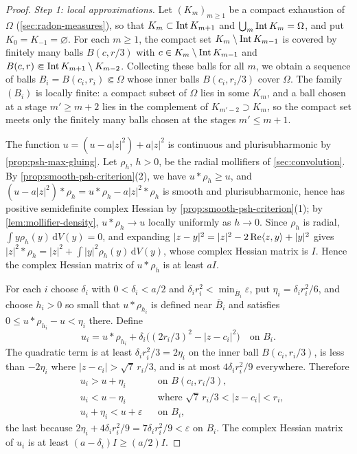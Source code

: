 \begin{proof}
\emph{Step 1: local approximations.} Let $(K_m)_{m\ge1}$ be a compact exhaustion of $\Omega$ (\cref{sec:radon-measures}), so that $K_m\subset\operatorname{Int} K_{m+1}$ and $\bigcup_m\operatorname{Int} K_m=\Omega$, and put $K_0=K_{-1}=\varnothing$. For each $m\ge1$, the compact set $K_m\setminus\operatorname{Int} K_{m-1}$ is covered by finitely many balls $B(c,r/3)$ with $c\in K_m\setminus\operatorname{Int} K_{m-1}$ and $B(c,r)\Subset\operatorname{Int} K_{m+1}\setminus K_{m-2}$. Collecting these balls for all $m$, we obtain a sequence of balls $B_i=B(c_i,r_i)\Subset\Omega$ whose inner balls $B(c_i,r_i/3)$ cover $\Omega$. The family $(B_i)$ is locally finite: a compact subset of $\Omega$ lies in some $K_m$, and a ball chosen at a stage $m'\ge m+2$ lies in the complement of $K_{m'-2}\supset K_m$, so the compact set meets only the finitely many balls chosen at the stages $m'\le m+1$.

The function $u=(u-a|z|^2)+a|z|^2$ is continuous and plurisubharmonic by \cref{prop:psh-max-gluing}. Let $\rho_h$, $h>0$, be the radial mollifiers of \cref{sec:convolution}. By \cref{prop:smooth-psh-criterion}(2), we have $u*\rho_h\ge u$, and $(u-a|z|^2)*\rho_h=u*\rho_h-a|z|^2*\rho_h$ is smooth and plurisubharmonic, hence has positive semidefinite complex Hessian by \cref{prop:smooth-psh-criterion}(1); by \cref{lem:mollifier-density}, $u*\rho_h\to u$ locally uniformly as $h\to0$. Since $\rho_h$ is radial, $\int y\rho_h(y)\,\mathrm dV(y)=0$, and expanding $|z-y|^2=|z|^2-2\operatorname{Re}\langle z,y\rangle+|y|^2$ gives $|z|^2*\rho_h=|z|^2+\int|y|^2\rho_h(y)\,\mathrm dV(y)$, whose complex Hessian matrix is $I$. Hence the complex Hessian matrix of $u*\rho_h$ is at least $aI$.

For each $i$ choose $\delta_i$ with $0<\delta_i<a/2$ and $\delta_ir_i^2<\min_{\overline B_i}\varepsilon$, put $\eta_i=\delta_ir_i^2/6$, and choose $h_i>0$ so small that $u*\rho_{h_i}$ is defined near $\overline B_i$ and satisfies $0\le u*\rho_{h_i}-u<\eta_i$ there. Define
\[
 u_i=u*\rho_{h_i}+\delta_i\bigl((2r_i/3)^2-|z-c_i|^2\bigr)
 \quad\text{on }B_i.
\]
The quadratic term is at least $\delta_ir_i^2/3=2\eta_i$ on the inner ball $B(c_i,r_i/3)$, is less than $-2\eta_i$ where $|z-c_i|>\sqrt7\,r_i/3$, and is at most $4\delta_ir_i^2/9$ everywhere. Therefore
\[
 \begin{aligned}
 &u_i>u+\eta_i&&\text{on }B(c_i,r_i/3),\\
 &u_i<u-\eta_i&&\text{where }\sqrt7\,r_i/3<|z-c_i|<r_i,\\
 &u_i+\eta_i<u+\varepsilon&&\text{on }B_i,
 \end{aligned}
\]
the last because $2\eta_i+4\delta_ir_i^2/9=7\delta_ir_i^2/9<\varepsilon$ on $B_i$. The complex Hessian matrix of $u_i$ is at least $(a-\delta_i)I\ge(a/2)I$.


\end{proof}
